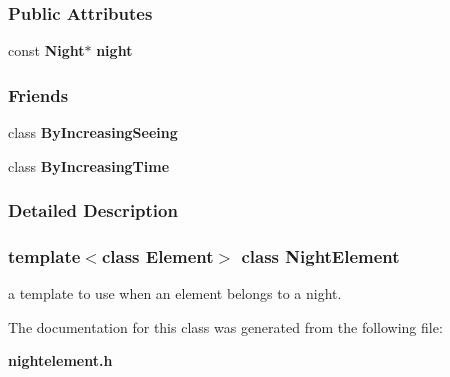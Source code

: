 \subsubsection*{Public Attributes}
\begin{CompactItemize}
\item 
{}
const {\bf Night}$\ast$ {\bf night}\label{class_nightelement_m0}

\end{CompactItemize}
\subsubsection*{Friends}
\begin{CompactItemize}
\item 
class {\bf By\-Increasing\-Seeing}
\item 
class {\bf By\-Increasing\-Time}
\end{CompactItemize}


\subsubsection{Detailed Description}
\subsubsection*{template$<$class Element$>$  class Night\-Element}

a template to use when an element belongs to a night.



The documentation for this class was generated from the following file:\begin{CompactItemize}
\item 
{\bf nightelement.h}\end{CompactItemize}
